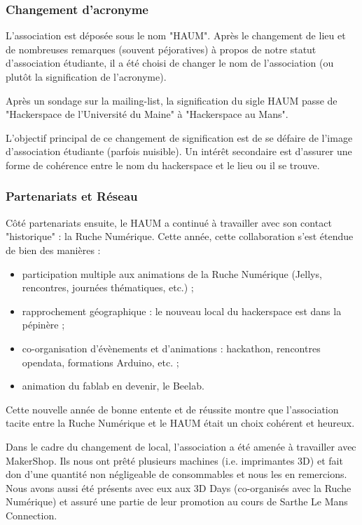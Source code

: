 \documentclass[11pt]{article}
\begin{document}
\subsubsection{Changement d'acronyme}

L'association est déposée sous le nom "HAUM". Après le changement de lieu et de nombreuses remarques (souvent péjoratives) à propos de notre statut d'association étudiante, il a été choisi de changer le nom de l'association (ou plutôt la signification de l'acronyme).

Après un sondage sur la mailing-list, la signification du sigle HAUM passe de "Hackerspace de l'Université du Maine" à "Hackerspace au Mans".

L'objectif principal de ce changement de signification est de se défaire de l'image d'association étudiante (parfois nuisible). Un intérêt secondaire est d'assurer une forme de cohérence entre le nom du hackerspace et le lieu ou il se trouve.

\subsubsection{Partenariats et Réseau}


Côté partenariats ensuite, le HAUM a continué à travailler avec son contact "historique" : la Ruche Numérique. Cette année, cette collaboration s'est étendue de bien des manières :

\begin{itemize}
    \item participation multiple aux animations de la Ruche Numérique (Jellys, rencontres, journées thématiques, etc.) ;
    \item rapprochement géographique : le nouveau local du hackerspace est dans la pépinère ;
    \item co-organisation d'évènements et d'animations : hackathon, rencontres opendata, formations Arduino, etc. ;
    \item animation du fablab en devenir, le Beelab.
\end{itemize}

Cette nouvelle année de bonne entente et de réussite montre que l'association tacite entre la Ruche Numérique et le HAUM était un choix cohérent et heureux.

Dans le cadre du changement de local, l'association a été amenée à travailler avec MakerShop. Ils nous ont prêté plusieurs machines (i.e. imprimantes 3D) et fait don d'une quantité non négligeable de consommables et nous les en remercions. Nous avons aussi été présents avec eux aux 3D Days (co-organisés avec la Ruche Numérique) et assuré une partie de leur promotion au cours de Sarthe Le Mans Connection.
\end{document}
